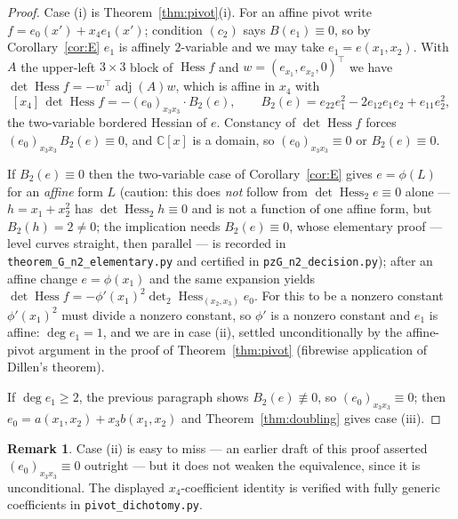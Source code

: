 \documentclass[11pt]{article}
\theoremstyle{plain}
\theoremstyle{definition}
\newtheorem{remark}[theorem]{Remark}
\newcommand{\C}{\mathbb{C}}
\newcommand{\Hess}{\operatorname{Hess}}
\newcommand{\adj}{\operatorname{adj}}
\begin{document}
\begin{proof}
Case (i) is Theorem~\ref{thm:pivot}(i). For an affine pivot write
$f=e_0(x')+x_4e_1(x')$; condition $(c_2)$ says $B(e_1)\equiv0$, so by
Corollary~\ref{cor:E} $e_1$ is affinely $2$-variable and we may take
$e_1=e(x_1,x_2)$. With $A$ the upper-left $3\times3$ block of $\Hess f$ and
$w=(e_{x_1},e_{x_2},0)^\top$ we have $\det\Hess f=-w^\top\adj(A)w$, which is
affine in $x_4$ with
\[
[x_4]\,\det\Hess f=-(e_0)_{x_3x_3}\cdot B_2(e),
\qquad
B_2(e)=e_{22}e_1^2-2e_{12}e_1e_2+e_{11}e_2^2 ,
\]
the two-variable bordered Hessian of $e$. Constancy of $\det\Hess f$ forces
$(e_0)_{x_3x_3}\,B_2(e)\equiv0$, and $\C[x]$ is a domain, so
$(e_0)_{x_3x_3}\equiv0$ or $B_2(e)\equiv0$.

If $B_2(e)\equiv0$ then the two-variable case of Corollary~\ref{cor:E}
gives $e=\phi(L)$ for an \emph{affine} form $L$ (caution: this does
\emph{not} follow from $\det\Hess_2e\equiv0$ alone --- $h=x_1+x_2^2$ has
$\det\Hess_2h\equiv0$ and is not a function of one affine form, but
$B_2(h)=2\ne0$; the implication needs $B_2(e)\equiv0$, whose elementary
proof --- level curves straight, then parallel --- is recorded in
\texttt{theorem\_G\_n2\_elementary.py} and certified in
\texttt{pzG\_n2\_decision.py}); after an affine
change $e=\phi(x_1)$ and the same expansion yields
$\det\Hess f=-\phi'(x_1)^2\det_2\Hess_{(x_2,x_3)}e_0$. For this to be a
nonzero constant $\phi'(x_1)^2$ must divide a nonzero constant, so $\phi'$
is a nonzero constant and $e_1$ is affine: $\deg e_1=1$, and we are in case
(ii), settled unconditionally by the affine-pivot argument in the proof of
Theorem~\ref{thm:pivot} (fibrewise application of Dillen's theorem).

If $\deg e_1\ge2$, the previous paragraph shows $B_2(e)\not\equiv0$, so
$(e_0)_{x_3x_3}\equiv0$; then $e_0=a(x_1,x_2)+x_3b(x_1,x_2)$ and
Theorem~\ref{thm:doubling} gives case (iii).
\end{proof}

\begin{remark}
Case (ii) is easy to miss --- an earlier draft of this proof asserted
$(e_0)_{x_3x_3}\equiv0$ outright --- but it does not weaken the
equivalence, since it is unconditional. The displayed $x_4$-coefficient
identity is verified with fully generic coefficients in
\texttt{pivot\_dichotomy.py}.
\end{remark}
\end{document}
